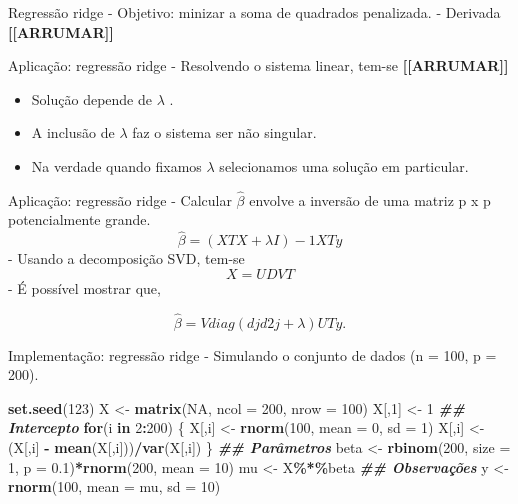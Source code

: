 \documentclass[
]{article}
\newenvironment{Shaded}{\begin{snugshade}}{\end{snugshade}}
\newcommand{\AttributeTok}[1]{\textcolor[rgb]{0.13,0.29,0.53}{#1}}
\newcommand{\ConstantTok}[1]{\textcolor[rgb]{0.56,0.35,0.01}{#1}}
\newcommand{\ControlFlowTok}[1]{\textcolor[rgb]{0.13,0.29,0.53}{\textbf{#1}}}
\newcommand{\DecValTok}[1]{\textcolor[rgb]{0.00,0.00,0.81}{#1}}
\newcommand{\DocumentationTok}[1]{\textcolor[rgb]{0.56,0.35,0.01}{\textbf{\textit{#1}}}}
\newcommand{\FloatTok}[1]{\textcolor[rgb]{0.00,0.00,0.81}{#1}}
\newcommand{\FunctionTok}[1]{\textcolor[rgb]{0.13,0.29,0.53}{\textbf{#1}}}
\newcommand{\NormalTok}[1]{#1}
\newcommand{\OtherTok}[1]{\textcolor[rgb]{0.56,0.35,0.01}{#1}}
\newcommand{\SpecialCharTok}[1]{\textcolor[rgb]{0.81,0.36,0.00}{\textbf{#1}}}
\providecommand{\tightlist}{%
  \setlength{\itemsep}{0pt}\setlength{\parskip}{0pt}}
\begin{document}
Regressão ridge - Objetivo: minizar a soma de quadrados penalizada. -
Derivada \textbf{{[}{[}ARRUMAR{]}{]}}

Aplicação: regressão ridge - Resolvendo o sistema linear, tem-se
\textbf{{[}{[}ARRUMAR{]}{]}}

\begin{itemize}
\tightlist
\item
  Solução depende de \(\lambda\) .
\item
  A inclusão de \(\lambda\) faz o sistema ser não singular.
\item
  Na verdade quando fixamos \(\lambda\) selecionamos uma solução em
  particular.
\end{itemize}

Aplicação: regressão ridge - Calcular \(\hat{\beta}\) envolve a inversão
de uma matriz p x p potencialmente grande.
\[\hat{\beta}  = (XTX + \lambda I)-1 XTy\] - Usando a decomposição SVD,
tem-se \[ X = UDVT\] - É possível mostrar que,

\[ \hat{\beta} = Vdiag ( dj d2 j  + \lambda  ) UTy .\]

Implementação: regressão ridge - Simulando o conjunto de dados (n = 100,
p = 200).

\begin{Shaded}
\begin{Highlighting}[]
\FunctionTok{set.seed}\NormalTok{(}\DecValTok{123}\NormalTok{)}
\NormalTok{X }\OtherTok{\textless{}{-}} \FunctionTok{matrix}\NormalTok{(}\ConstantTok{NA}\NormalTok{, }\AttributeTok{ncol =} \DecValTok{200}\NormalTok{, }\AttributeTok{nrow =} \DecValTok{100}\NormalTok{)}
\NormalTok{X[,}\DecValTok{1}\NormalTok{] }\OtherTok{\textless{}{-}} \DecValTok{1} \DocumentationTok{\#\# Intercepto}
\ControlFlowTok{for}\NormalTok{(i }\ControlFlowTok{in} \DecValTok{2}\SpecialCharTok{:}\DecValTok{200}\NormalTok{) \{}
\NormalTok{X[,i] }\OtherTok{\textless{}{-}} \FunctionTok{rnorm}\NormalTok{(}\DecValTok{100}\NormalTok{, }\AttributeTok{mean =} \DecValTok{0}\NormalTok{, }\AttributeTok{sd =} \DecValTok{1}\NormalTok{)}
\NormalTok{X[,i] }\OtherTok{\textless{}{-}}\NormalTok{ (X[,i] }\SpecialCharTok{{-}} \FunctionTok{mean}\NormalTok{(X[,i]))}\SpecialCharTok{/}\FunctionTok{var}\NormalTok{(X[,i])}
\NormalTok{\}}
\DocumentationTok{\#\# Parâmetros}
\NormalTok{beta }\OtherTok{\textless{}{-}} \FunctionTok{rbinom}\NormalTok{(}\DecValTok{200}\NormalTok{, }\AttributeTok{size =} \DecValTok{1}\NormalTok{, }\AttributeTok{p =} \FloatTok{0.1}\NormalTok{)}\SpecialCharTok{*}\FunctionTok{rnorm}\NormalTok{(}\DecValTok{200}\NormalTok{, }\AttributeTok{mean =} \DecValTok{10}\NormalTok{)}
\NormalTok{mu }\OtherTok{\textless{}{-}}\NormalTok{ X}\SpecialCharTok{\%*\%}\NormalTok{beta}
\DocumentationTok{\#\# Observações}
\NormalTok{y }\OtherTok{\textless{}{-}} \FunctionTok{rnorm}\NormalTok{(}\DecValTok{100}\NormalTok{, }\AttributeTok{mean =}\NormalTok{ mu, }\AttributeTok{sd =} \DecValTok{10}\NormalTok{)}
\end{Highlighting}
\end{Shaded}
\end{document}
